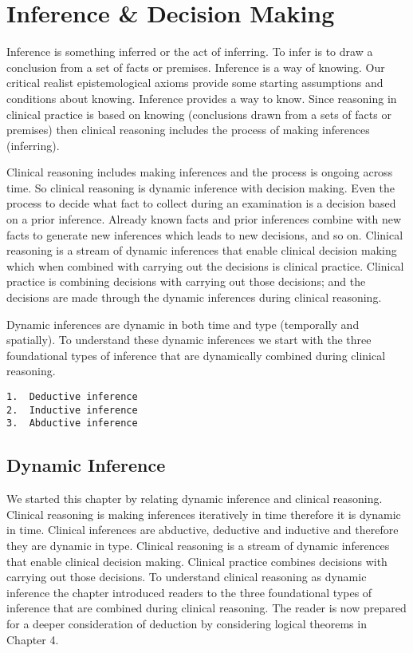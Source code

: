 \documentclass[
]{book}
\begin{document}
\hypertarget{inference-decision-making}{%
\chapter{Inference \& Decision Making}\label{inference-decision-making}}

Inference is something inferred or the act of inferring. To infer is to draw a conclusion from a set of facts or premises. Inference is a way of knowing. Our critical realist epistemological axioms provide some starting assumptions and conditions about knowing. Inference provides a way to know. Since reasoning in clinical practice is based on knowing (conclusions drawn from a sets of facts or premises) then clinical reasoning includes the process of making inferences (inferring).

Clinical reasoning includes making inferences and the process is ongoing across time. So clinical reasoning is dynamic inference with decision making. Even the process to decide what fact to collect during an examination is a decision based on a prior inference. Already known facts and prior inferences combine with new facts to generate new inferences which leads to new decisions, and so on. Clinical reasoning is a stream of dynamic inferences that enable clinical decision making which when combined with carrying out the decisions is clinical practice. Clinical practice is combining decisions with carrying out those decisions; and the decisions are made through the dynamic inferences during clinical reasoning.

Dynamic inferences are dynamic in both time and type (temporally and spatially). To understand these dynamic inferences we start with the three foundational types of inference that are dynamically combined during clinical reasoning.

\begin{verbatim}
1.  Deductive inference
2.  Inductive inference
3.  Abductive inference 
\end{verbatim}

\hypertarget{dynamic-inference}{%
\section{Dynamic Inference}\label{dynamic-inference}}

We started this chapter by relating dynamic inference and clinical reasoning. Clinical reasoning is making inferences iteratively in time therefore it is dynamic in time. Clinical inferences are abductive, deductive and inductive and therefore they are dynamic in type. Clinical reasoning is a stream of dynamic inferences that enable clinical decision making. Clinical practice combines decisions with carrying out those decisions. To understand clinical reasoning as dynamic inference the chapter introduced readers to the three foundational types of inference that are combined during clinical reasoning. The reader is now prepared for a deeper consideration of deduction by considering logical theorems in Chapter 4.
\end{document}
